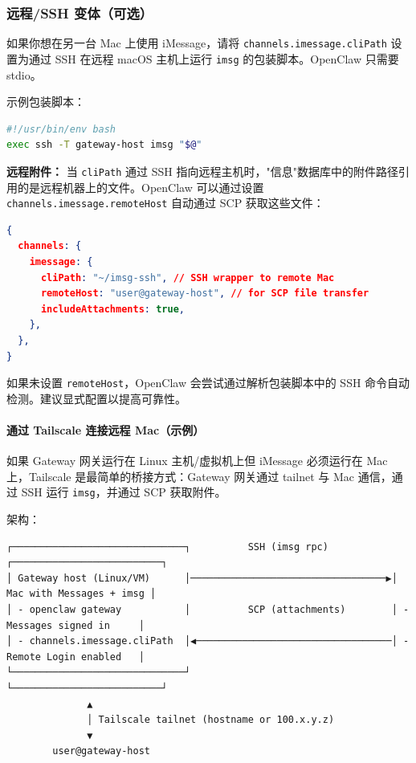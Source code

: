 \subsubsection{远程/SSH 变体（可选）}


如果你想在另一台 Mac 上使用 iMessage，请将 \texttt{channels.imessage.cliPath} 设置为通过 SSH 在远程 macOS 主机上运行 \texttt{imsg} 的包装脚本。OpenClaw 只需要 stdio。

示例包装脚本：

\begin{lstlisting}[language=bash]
#!/usr/bin/env bash
exec ssh -T gateway-host imsg "$@"
\end{lstlisting}


\textbf{远程附件：} 当 \texttt{cliPath} 通过 SSH 指向远程主机时，"信息"数据库中的附件路径引用的是远程机器上的文件。OpenClaw 可以通过设置 \texttt{channels.imessage.remoteHost} 自动通过 SCP 获取这些文件：

\begin{lstlisting}[language=json]
{
  channels: {
    imessage: {
      cliPath: "~/imsg-ssh", // SSH wrapper to remote Mac
      remoteHost: "user@gateway-host", // for SCP file transfer
      includeAttachments: true,
    },
  },
}
\end{lstlisting}


如果未设置 \texttt{remoteHost}，OpenClaw 会尝试通过解析包装脚本中的 SSH 命令自动检测。建议显式配置以提高可靠性。

\paragraph{通过 Tailscale 连接远程 Mac（示例）}


如果 Gateway 网关运行在 Linux 主机/虚拟机上但 iMessage 必须运行在 Mac 上，Tailscale 是最简单的桥接方式：Gateway 网关通过 tailnet 与 Mac 通信，通过 SSH 运行 \texttt{imsg}，并通过 SCP 获取附件。

架构：

\begin{lstlisting}
┌──────────────────────────────┐          SSH (imsg rpc)          ┌──────────────────────────┐
│ Gateway host (Linux/VM)      │──────────────────────────────────▶│ Mac with Messages + imsg │
│ - openclaw gateway           │          SCP (attachments)        │ - Messages signed in     │
│ - channels.imessage.cliPath  │◀──────────────────────────────────│ - Remote Login enabled   │
└──────────────────────────────┘                                   └──────────────────────────┘
              ▲
              │ Tailscale tailnet (hostname or 100.x.y.z)
              ▼
        user@gateway-host
\end{lstlisting}


